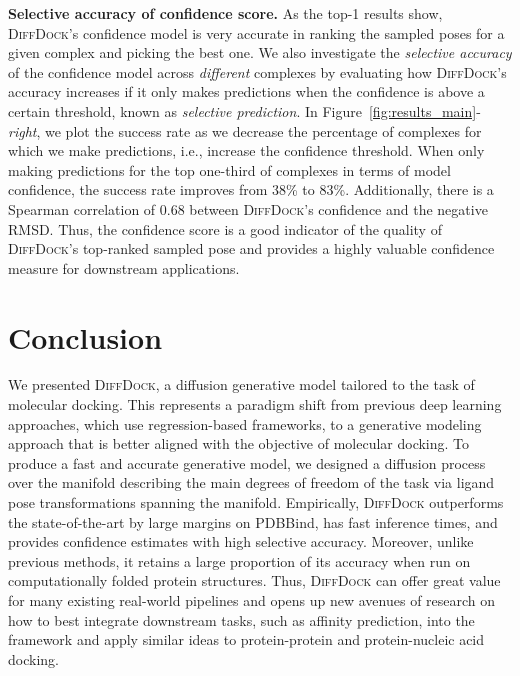 \documentclass{article} \usepackage{iclr2023_conference,times}
\newcommand{\new}[1]{#1}
\begin{document}
\textbf{Selective accuracy of confidence score.} As the top-1 results show, \textsc{DiffDock}'s confidence model is very accurate in ranking the sampled poses for a given complex and picking the best one. We also investigate the \textit{selective accuracy} of the confidence model across \emph{different} complexes by evaluating how \textsc{DiffDock}'s accuracy increases if it only makes predictions when the confidence is above a certain threshold, known as \textit{selective prediction}. In Figure~\ref{fig:results_main}-\textit{right}, we plot the success rate as we decrease the percentage of complexes for which we make predictions, i.e., increase the confidence threshold. When only making predictions for the top one-third of complexes in terms of model confidence, the success rate improves from 38\% to 8\new{3}\%. Additionally, there is a Spearman correlation of 0.\new{68} between \textsc{DiffDock}'s confidence and the negative RMSD. Thus, the confidence score is a good indicator of the quality of \textsc{DiffDock}'s top-ranked sampled pose and provides a highly valuable confidence measure for downstream applications. 



\section{Conclusion} \label{sec:conclusion}

We presented \textsc{DiffDock}, a diffusion generative model tailored to the task of molecular docking. This represents a paradigm shift from previous deep learning approaches, which use regression-based frameworks, to a generative modeling approach that is better aligned with the objective of molecular docking. To produce a fast and accurate generative model, we designed a diffusion process over the manifold describing the main degrees of freedom of the task via ligand pose transformations spanning the manifold. Empirically, \textsc{DiffDock} outperforms the state-of-the-art by large margins on PDBBind, has fast inference times, and provides confidence estimates with high selective accuracy. Moreover, unlike previous methods, it retains a large proportion of its accuracy when run on computationally folded protein structures. Thus, \textsc{DiffDock} can offer great value for many existing real-world pipelines and opens up new avenues of research on how to best integrate downstream tasks, such as affinity prediction, into the framework and apply similar ideas to protein-protein and protein-nucleic acid docking.
\end{document}
